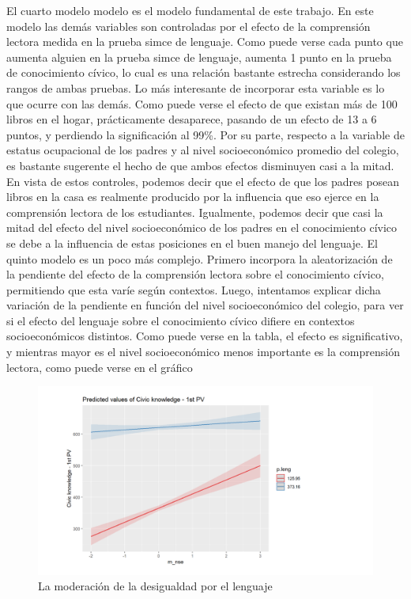 \documentclass[
]{article}
\begin{document}
El cuarto modelo modelo es el modelo fundamental de este trabajo. En
este modelo las demás variables son controladas por el efecto de la
comprensión lectora medida en la prueba simce de lenguaje. Como puede
verse cada punto que aumenta alguien en la prueba simce de lenguaje,
aumenta 1 punto en la prueba de conocimiento cívico, lo cual es una
relación bastante estrecha considerando los rangos de ambas pruebas. Lo
más interesante de incorporar esta variable es lo que ocurre con las
demás. Como puede verse el efecto de que existan más de 100 libros en el
hogar, prácticamente desaparece, pasando de un efecto de 13 a 6 puntos,
y perdiendo la significación al 99\%. Por su parte, respecto a la
variable de estatus ocupacional de los padres y al nivel socioeconómico
promedio del colegio, es bastante sugerente el hecho de que ambos
efectos disminuyen casi a la mitad. En vista de estos controles, podemos
decir que el efecto de que los padres posean libros en la casa es
realmente producido por la influencia que eso ejerce en la comprensión
lectora de los estudiantes. Igualmente, podemos decir que casi la mitad
del efecto del nivel socioeconómico de los padres en el conocimiento
cívico se debe a la influencia de estas posiciones en el buen manejo del
lenguaje. El quinto modelo es un poco más complejo. Primero incorpora la
aleatorización de la pendiente del efecto de la comprensión lectora
sobre el conocimiento cívico, permitiendo que esta varíe según
contextos. Luego, intentamos explicar dicha variación de la pendiente en
función del nivel socioeconómico del colegio, para ver si el efecto del
lenguaje sobre el conocimiento cívico difiere en contextos
socioeconómicos distintos. Como puede verse en la tabla, el efecto es
significativo, y mientras mayor es el nivel socioeconómico menos
importante es la comprensión lectora, como puede verse en el gráfico

\begin{figure}
\centering
\includegraphics{../output/images/interaccionfinal.png}
\caption{La moderación de la desigualdad por el lenguaje}
\end{figure}
\end{document}
